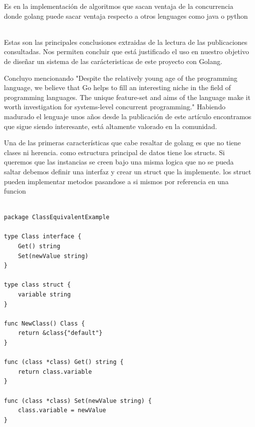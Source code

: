 Es en la implementación de algoritmos que sacan ventaja de la concurrencia donde golang puede sacar ventaja respecto a otros lenguages como java o python ~\cite{Jenkins201714}

Estas son las principales conclusiones extraidas de la lectura de las publicaciones consultadas.
\cite{Effendy20211955}
\cite{Dymora20201}
\cite{Meyerson2014104+101}
\cite{Ray202110857}
\cite{Jenkins201714}
\cite{Ding2021321}
\cite{Taheri2021138}
\cite{NoAuthor2021179}
\cite{Dilley2019377}
\cite{Qiu2018}
\cite{Shoumik20181}
\cite{Mladenovic2018}
\cite{Benedict2017437}
\cite{Irawan2017}
\cite{Samaniego2017116}
\cite{Khaitan20152909}
\cite{Leokhin2015656}
\cite{Komendantskaya2014121}
\cite{Mittal2014292}
\cite{WhiteheadII2011209}
Nos permiten concluir que está justificado el uso en nuestro objetivo de diseñar un sistema de las carácteristicas de este proyecto con Golang.

Concluyo mencionando \cite{WhiteheadII2011209}"Despite the relatively young age of the programming language, we believe that Go helps
to fill an interesting niche in the field of programming languages. The unique feature-set and
aims of the language make it worth investigation for systems-level concurrent programming." Habiendo madurado el lenguaje unos años desde la publicación de este artículo encontramos que sigue siendo interesante, está altamente valorado en la comunidad.




Una de las primeras características que cabe resaltar de golang es que no tiene clases ni herencia. como estructura
principal de datos tiene los structs. Si queremos que las instancias se creen bajo una misma logica que no se pueda saltar
debemos definir una interfaz y crear un struct que la implemente. los struct pueden implementar metodos pasandose a si mismos por referencia en una funcion

\begin{lstlisting}[label={lst:lstlisting}]

package ClassEquivalentExample

type Class interface {
	Get() string
	Set(newValue string)
}

type class struct {
	variable string
}

func NewClass() Class {
	return &class{"default"}
}

func (class *class) Get() string {
	return class.variable
}

func (class *class) Set(newValue string) {
	class.variable = newValue
}

\end{lstlisting}

